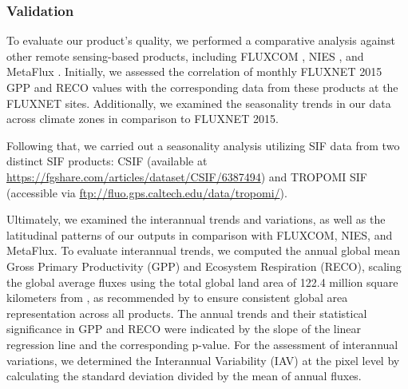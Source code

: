 \subsubsection{Validation}
To evaluate our product's quality, we performed a comparative analysis against other remote sensing-based products, including FLUXCOM \citep{jung2019fluxcom}, NIES \citep{zeng2020global}, and MetaFlux \citep{nathaniel2023metaflux}. Initially, we assessed the correlation of monthly FLUXNET 2015 GPP and RECO values with the corresponding data from these products at the FLUXNET sites. Additionally, we examined the seasonality trends in our data across climate zones in comparison to FLUXNET 2015. \par

Following that, we carried out a seasonality analysis utilizing SIF data from two distinct SIF products: CSIF \citep{zhang2018global} (available at \url{https://fgshare.com/articles/dataset/CSIF/6387494}) and TROPOMI SIF \citep{kohler2018global} (accessible via \url{ftp://fluo.gps.caltech.edu/data/tropomi/}).\par

Ultimately, we examined the interannual trends and variations, as well as the latitudinal patterns of our outputs in comparison with FLUXCOM, NIES, and MetaFlux. To evaluate interannual trends, we computed the annual global mean Gross Primary Productivity (GPP) and Ecosystem Respiration (RECO), scaling the global average fluxes using the total global land area of 122.4 million square kilometers from \citep{friedl2010modis}, as recommended by \citep{jung2020scaling} to ensure consistent global area representation across all products. The annual trends and their statistical significance in GPP and RECO were indicated by the slope of the linear regression line and the corresponding p-value. For the assessment of interannual variations, we determined the Interannual Variability (IAV) at the pixel level by calculating the standard deviation divided by the mean of annual fluxes.\par


